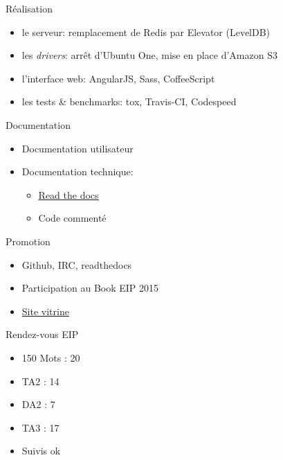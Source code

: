 \documentclass{beamer}
\begin{document}
\begin{frame}{Réalisation}
\begin{itemize}
  \item le serveur: remplacement de Redis par Elevator (LevelDB)
  \item les \emph{drivers}: arrêt d'Ubuntu One, mise en place d'Amazon S3
  \item l'interface web: AngularJS, Sass, CoffeeScript
  \item les tests \& benchmarks: tox, Travis-CI, Codespeed
\end{itemize}
\end{frame}

\begin{frame}{Documentation}
\begin{itemize}
  \item Documentation utilisateur
  \item Documentation technique:
  \begin{itemize}
  	\item \underline{\hyperlink{http://onitu.readthedocs.org/en/latest/}{Read the docs}}
    \item Code commenté
  \end{itemize}
\end{itemize}
\end{frame}

\begin{frame}{Promotion}
\begin{itemize}
  \item Github, IRC, readthedocs
  \item Participation au Book EIP 2015
  \item \hyperlink{http://eip.epitech.eu/2015/onitu/}{Site vitrine}
\end{itemize}
\end{frame}

\begin{frame}{Rendez-vous EIP}
\begin{itemize}
  \item 150 Mots : 20
  \item TA2  : 14
  \item DA2  : 7
  \item TA3   : 17
  \item Suivis ok
\end{itemize}
\end{frame}
\end{document}
